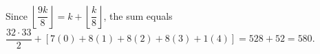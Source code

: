 Since $\left\lfloor\dfrac{9k}{8}\right\rfloor=k+\left\lfloor\dfrac{k}{8}\right\rfloor$, the sum equals $\dfrac{32\cdot33}{2}+[7(0)+8(1)+8(2)+8(3)+1(4)]=528+52=\boxed{580}$.
